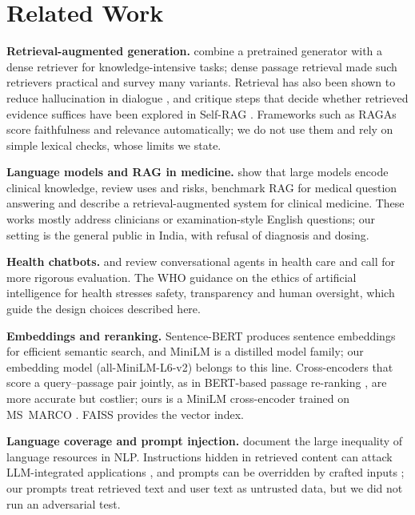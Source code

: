 \documentclass[10pt,a4paper]{article}
\begin{document}
\section{Related Work}
\textbf{Retrieval-augmented generation.} \citet{lewis2020} combine a pretrained generator with a dense retriever for knowledge-intensive tasks; dense passage retrieval \citep{karpukhin2020} made such retrievers practical and \citet{gao2023} survey many variants. Retrieval has also been shown to reduce hallucination in dialogue \citep{shuster2021}, and critique steps that decide whether retrieved evidence suffices have been explored in Self-RAG \citep{asai2024}. Frameworks such as RAGAs \citep{es2024} score faithfulness and relevance automatically; we do not use them and rely on simple lexical checks, whose limits we state.

\textbf{Language models and RAG in medicine.} \citet{singhal2023} show that large models encode clinical knowledge, \citet{thirunavukarasu2023} review uses and risks, \citet{xiong2024} benchmark RAG for medical question answering and \citet{zakka2024} describe a retrieval-augmented system for clinical medicine. These works mostly address clinicians or examination-style English questions; our setting is the general public in India, with refusal of diagnosis and dosing.

\textbf{Health chatbots.} \citet{laranjo2018} and \citet{tudorcar2020} review conversational agents in health care and call for more rigorous evaluation. The WHO guidance on the ethics of artificial intelligence for health \citep{who2021} stresses safety, transparency and human oversight, which guide the design choices described here.

\textbf{Embeddings and reranking.} Sentence-BERT \citep{reimers2019} produces sentence embeddings for efficient semantic search, and MiniLM \citep{wang2020} is a distilled model family; our embedding model (all-MiniLM-L6-v2) belongs to this line. Cross-encoders that score a query--passage pair jointly, as in BERT-based passage re-ranking \citep{nogueira2019}, are more accurate but costlier; ours is a MiniLM cross-encoder trained on MS~MARCO \citep{bajaj2016}. FAISS \citep{johnson2019} provides the vector index.

\textbf{Language coverage and prompt injection.} \citet{joshi2020} document the large inequality of language resources in NLP. Instructions hidden in retrieved content can attack LLM-integrated applications \citep{greshake2023}, and prompts can be overridden by crafted inputs \citep{perez2022}; our prompts treat retrieved text and user text as untrusted data, but we did not run an adversarial test.
\end{document}
